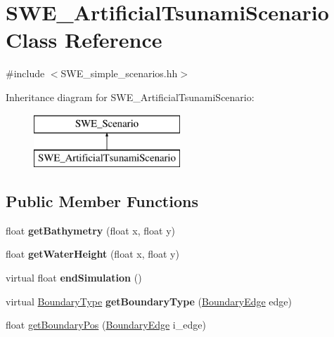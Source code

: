 \hypertarget{classSWE__ArtificialTsunamiScenario}{\section{S\-W\-E\-\_\-\-Artificial\-Tsunami\-Scenario Class Reference}
\label{classSWE__ArtificialTsunamiScenario}
}


{\ttfamily \#include $<$S\-W\-E\-\_\-simple\-\_\-scenarios.\-hh$>$}

Inheritance diagram for S\-W\-E\-\_\-\-Artificial\-Tsunami\-Scenario\-:\begin{figure}[H]
\begin{center}
\leavevmode
\includegraphics[height=2.000000cm]{classSWE__ArtificialTsunamiScenario}
\end{center}
\end{figure}
\subsection*{Public Member Functions}
\begin{DoxyCompactItemize}
\item 
\hypertarget{classSWE__ArtificialTsunamiScenario_acbc4c3127f531862d01c4661da144836}{float {\bfseries get\-Bathymetry} (float x, float y)}\label{classSWE__ArtificialTsunamiScenario_acbc4c3127f531862d01c4661da144836}

\item 
\hypertarget{classSWE__ArtificialTsunamiScenario_aef1c04137080ab89e437d5a912b85dcb}{float {\bfseries get\-Water\-Height} (float x, float y)}\label{classSWE__ArtificialTsunamiScenario_aef1c04137080ab89e437d5a912b85dcb}

\item 
\hypertarget{classSWE__ArtificialTsunamiScenario_ac402138d10edcbe7faec4a683de0ebdb}{virtual float {\bfseries end\-Simulation} ()}\label{classSWE__ArtificialTsunamiScenario_ac402138d10edcbe7faec4a683de0ebdb}

\item 
\hypertarget{classSWE__ArtificialTsunamiScenario_af40ccfcb7986958441acd2b26e1b07dd}{virtual \hyperlink{SWE__Scenario_8hh_af75d5dd7322fa39ed0af4e7839e600f8}{Boundary\-Type} {\bfseries get\-Boundary\-Type} (\hyperlink{SWE__Scenario_8hh_aa5e01e3f7df312f7b9b0d02521141fcc}{Boundary\-Edge} edge)}\label{classSWE__ArtificialTsunamiScenario_af40ccfcb7986958441acd2b26e1b07dd}

\item 
float \hyperlink{classSWE__ArtificialTsunamiScenario_ab61b4cb9598a368ef14c2f2a165fe56c}{get\-Boundary\-Pos} (\hyperlink{SWE__Scenario_8hh_aa5e01e3f7df312f7b9b0d02521141fcc}{Boundary\-Edge} i\-\_\-edge)
\end{DoxyCompactItemize}

